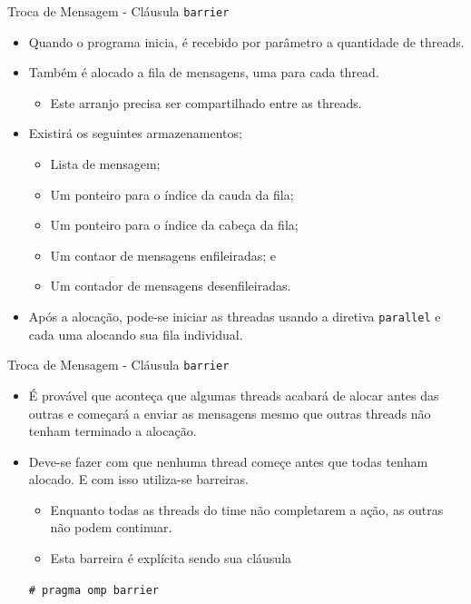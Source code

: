 	\begin{frame}{Troca de Mensagem -  Cláusula {\tt barrier}}
		\begin{itemize}
			\item Quando o programa inicia, é recebido por parâmetro a quantidade de threads.
			\item Também é alocado a fila de mensagens, uma para cada thread.
			\begin{itemize}
				\item Este arranjo precisa ser compartilhado entre as threads.
			\end{itemize}
					\bigskip
			\item Existirá os seguintes armazenamentos;
			\begin{itemize}
				\item Lista de mensagem;
				\item Um ponteiro para o índice da cauda da fila;
				\item Um ponteiro para o índice da cabeça da fila;
				\item Um contaor de mensagens enfileiradas; e
				\item Um contador de mensagens desenfileiradas.
			\end{itemize}
			\item Após a alocação, pode-se iniciar as threadas usando a diretiva {\tt parallel} e cada uma alocando sua fila individual.
		\end{itemize}
	\end{frame}

	\begin{frame}{Troca de Mensagem -   Cláusula {\tt barrier}}
		\begin{itemize}
			\item É provável que aconteça que algumas threads acabará de alocar antes das outras e começará a enviar as mensagens mesmo que outras threads não tenham terminado a alocação.
					\bigskip
			\item Deve-se fazer com que nenhuma thread começe antes que todas tenham alocado. E com isso utiliza-se barreiras.
			\begin{itemize}
				\item Enquanto todas as threads do time não completarem a ação, as outras não podem continuar.
				\item Esta barreira é explícita sendo sua cláusula
			\end{itemize}
			{\tt \#	pragma omp barrier}
		\end{itemize}
	\end{frame}

